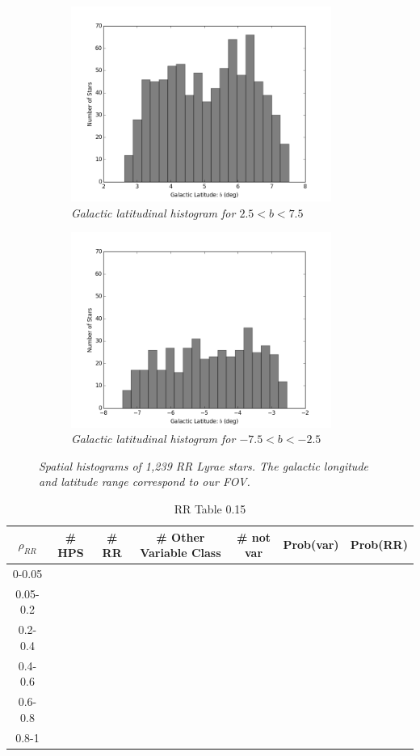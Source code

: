 \documentclass[aps,prb,twocolumn,superscriptaddress]{revtex4-1}
\begin{document}
\begin{figure}
	\begin{subfigure}{.5\textwidth}
	  \centering
	  \includegraphics[width=3.35in]{figures/PlotsSpace15/bphist_limit15.png}
		\caption{\it \small{Galactic latitudinal histogram for $2.5 < b < 7.5$}}
		\label{fig:bphist}
	\end{subfigure}%
	\begin{subfigure}{.5\textwidth}
	  \centering
			\includegraphics[width=3.35in]{figures/PlotsSpace15/bnhist_limit15.png}
		\caption{\it \small{Galactic latitudinal histogram for $-7.5 < b < -2.5$}}
		\label{fig:bnhist}
	\end{subfigure}%
	\caption{\it \small{Spatial histograms of 1,239 RR Lyrae stars. The galactic longitude and latitude range correspond to our FOV.}}
	\label{fig:blhist}
\end{figure}

 





\iffalse
	\begin{table}[H]
	\begin{center}
		\begin{tabular}{ | c | c | c | c | c | c | c | }\hline
		$\rho_{RR}$ & \# HPS & \# RR & \# Other Variable Class & \# not var & Prob(var) & Prob(RR) \\ \hline
		0-0.05 &&&&&& \\ \hline
		0.05-0.2 &&&&&& \\ \hline
		0.2-0.4 &&&&&& \\ \hline
		0.4-0.6 &&&&&& \\ \hline
		0.6-0.8 &&&&&& \\ \hline
		0.8-1 &&&&&& \\ \hline
		\end{tabular}
	\end{center}
	\caption{ \small{RR Table 0.15 \label{tab:rrtab}}}
	\end{table}
\end{document}

